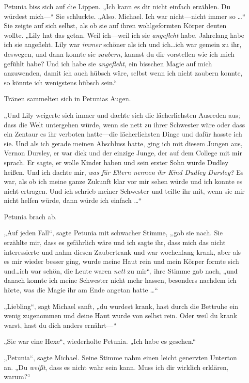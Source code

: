 {Petunia biss sich auf die Lippen. „Ich kann es dir nicht einfach erzählen. Du würdest mich—“ Sie schluckte. „Also. Michael. Ich war nicht—nicht immer so …“ Sie zeigte auf sich selbst, als ob sie auf ihren wohlgeformten Körper deuten wollte. „Lily hat das getan. Weil ich—weil ich sie \emph{angefleht} habe. Jahrelang habe ich sie angefleht. Lily war \emph{immer} schöner als ich und ich…ich war gemein zu ihr, deswegen, und dann konnte sie \emph{zaubern}, kannst du dir vorstellen wie ich mich gefühlt habe? Und ich habe sie \emph{angefleht}, ein bisschen Magie auf mich anzuwenden, damit ich auch hübsch wäre, selbst wenn ich nicht zaubern konnte, so könnte ich wenigstens hübsch sein.“

Tränen sammelten sich in Petunias Augen.

„Und Lily weigerte sich immer und dachte sich die lächerlichsten Ausreden aus; dass die Welt untergehen würde, wenn sie nett zu ihrer Schwester wäre oder dass ein Zentaur es ihr verboten hatte—die lächerlichsten Dinge und dafür hasste ich sie. Und als ich gerade meinen Abschluss hatte, ging ich mit diesem Jungen aus, Vernon Dursley, er war dick und der einzige Junge, der auf dem College mit mir sprach. Er sagte, er wolle Kinder haben und sein erster Sohn würde Dudley heißen. Und ich dachte mir, \emph{was für Eltern nennen ihr Kind Dudley Dursley?} Es war, als ob ich meine ganze Zukunft klar vor mir sehen würde und ich konnte es nicht ertragen. Und ich schrieb meiner Schwester und teilte ihr mit, wenn sie mir nicht helfen würde, dann würde ich einfach …“

Petunia brach ab.

„Auf jeden Fall“, sagte Petunia mit schwacher Stimme, „gab sie nach. Sie erzählte mir, dass es gefährlich wäre und ich sagte ihr, dass mich das nicht interessierte und nahm diesen Zaubertrank und war wochenlang krank, aber als es mir wieder besser ging, wurde meine Haut rein und mein Körper formte sich und…ich war schön, die Leute waren \emph{nett} zu mir“, ihre Stimme gab nach, „und danach konnte ich meine Schwester nicht mehr hassen, besonders nachdem ich hörte, was die Magie ihr am Ende angetan hatte …“

„Liebling“, sagt Michael sanft, „du wurdest krank, hast durch die Bettruhe ein wenig zugenommen und deine Haut wurde von selbst rein. Oder weil du krank warst, hast du dich anders ernährt—“

„Sie war eine Hexe“, wiederholte Petunia. „Ich habe es gesehen.“

„Petunia“, sagte Michael. Seine Stimme nahm einen leicht genervten Unterton an. „Du \emph{weißt}, dass es nicht wahr sein kann. Muss ich dir wirklich erklären, warum?“

}
